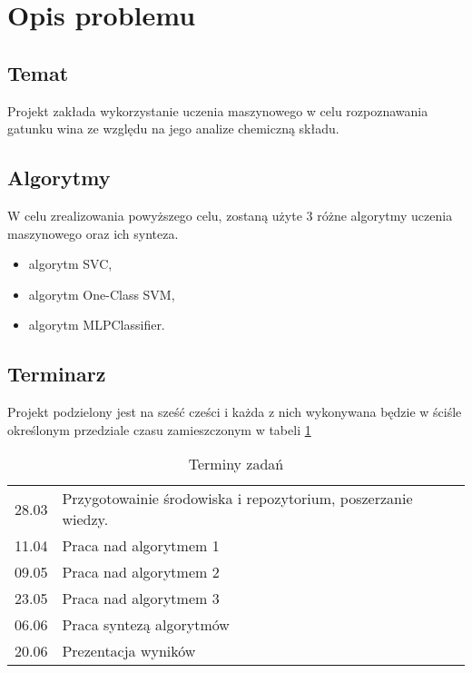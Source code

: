 \documentclass[12pt,a4paper]{article}
\begin{document}
\pdfpageheight   297mm
\pdfpagewidth    210mm

\StronaTytulowa
\SpisTresci

\pagebreak

\section{Opis problemu}
  \subsection{Temat}
  Projekt zakłada wykorzystanie uczenia maszynowego w celu rozpoznawania gatunku wina ze względu na jego analize chemiczną składu.

  \subsection{Algorytmy}
  W celu zrealizowania powyższego celu, zostaną użyte 3 różne algorytmy uczenia maszynowego oraz ich synteza.

  \begin{itemize}
    \item algorytm SVC,
    \item algorytm One-Class SVM,
    \item algorytm MLPClassifier.
  \end{itemize}

  \subsection{Terminarz}
  Projekt podzielony jest na sześć cześci i każda z nich wykonywana będzie w ściśle określonym przedziale czasu zamieszczonym w tabeli \ref{terminarz}

  \begin{table}[h!]
    \centering
    \begin{tabular}{ r | l }
    28.03 & Przygotowainie środowiska i repozytorium, poszerzanie wiedzy. \\
    11.04 & Praca nad algorytmem 1 \\
    09.05 & Praca nad algorytmem 2 \\
    23.05 & Praca nad algorytmem 3 \\
    06.06 & Praca syntezą algorytmów \\
    20.06 & Prezentacja wyników \\
    \end{tabular}
    \label{terminarz}
    \caption{Terminy zadań}
  \end{table}
\end{document}

